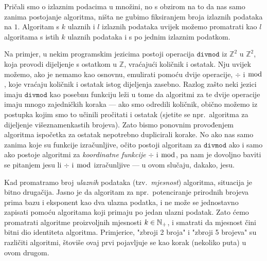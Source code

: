 
\begin{napomena}[{name=[samo jedan izlazni podatak]}]\label{nap:brip}
Pričali smo o izlaznim podacima u množini, no s obzirom na to da nas samo zanima postojanje algoritma, ništa ne gubimo fiksiranjem broja izlaznih podataka na $1$. Algoritam s $k$ ulaznih i $l$ izlaznih podataka uvijek možemo promatrati kao $l$ algoritama s istih $k$ ulaznih podataka i s po jednim izlaznim podatkom.

    Na primjer, u nekim programskim jezicima postoji operacija $\texttt{divmod}$ iz $\mathbb Z^2$ u $\mathbb Z^2$, koja provodi dijeljenje s ostatkom u $\mathbb Z$, vraćajući količnik i ostatak. Nju uvijek možemo, ako je nemamo kao osnovnu, emulirati pomoću dvije operacije, $\div$ i $\bmod$, koje vraćaju količnik i ostatak istog dijeljenja zasebno. Razlog zašto neki jezici imaju $\texttt{divmod}$ kao posebnu funkciju leži u tome da algoritmi za te dvije operacije imaju mnogo zajedničkih koraka --- ako smo odredili količnik, obično možemo iz postupka kojim smo to učinili pročitati i ostatak (sjetite se npr.\ algoritma za dijeljenje višeznamenkastih brojeva). Zato bismo ponovnim provođenjem algoritma ispočetka za ostatak nepotrebno duplicirali korake. No ako nas samo zanima koje su funkcije izračunljive, očito postoji algoritam za $\texttt{divmod}$ ako i samo ako postoje algoritmi za \emph{koordinatne funkcije} $\div$ i $\bmod$, pa nam je dovoljno baviti se pitanjem jesu li $\div$ i $\bmod$ izračunljive --- u ovom slučaju, dakako, jesu.
\end{napomena}

Kad promatramo broj \emph{ulaznih} podataka (tzv.\ \emph{mjesnost}) algoritma, situacija je bitno drugačija. Jasno je da algoritam za npr.\ potenciranje prirodnih brojeva prima bazu i eksponent kao dva ulazna podatka, i ne može se jednostavno zapisati pomoću algoritama koji primaju po jedan ulazni podatak. %
Zato ćemo promatrati algoritme proizvoljnih mjesnosti $k\in{\mathbb N}_+$, i smatrati da mjesnost čini bitni dio identiteta algoritma. Primjerice, "zbroji 2 broja" i "zbroji 5 brojeva" su različiti algoritmi, štoviše ovaj prvi pojavljuje se kao korak (nekoliko puta) u ovom drugom.

